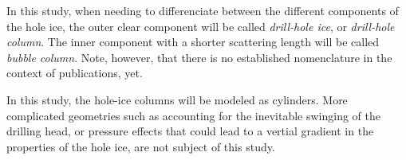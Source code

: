 In this study, when needing to differenciate between the different components of the hole ice, the outer clear component will be called \textit{drill-hole ice}, or \textit{drill-hole column}. The inner component with a shorter scattering length will be called \textit{bubble column}. Note, however, that there is no established nomenclature in the context of \icecube publications, yet.

In this study, the hole-ice columns will be modeled as cylinders. More complicated geometries such as accounting for the inevitable swinging of the drilling head, or pressure effects that could lead to a vertial gradient in the properties of the hole ice, are not subject of this study.\followup


